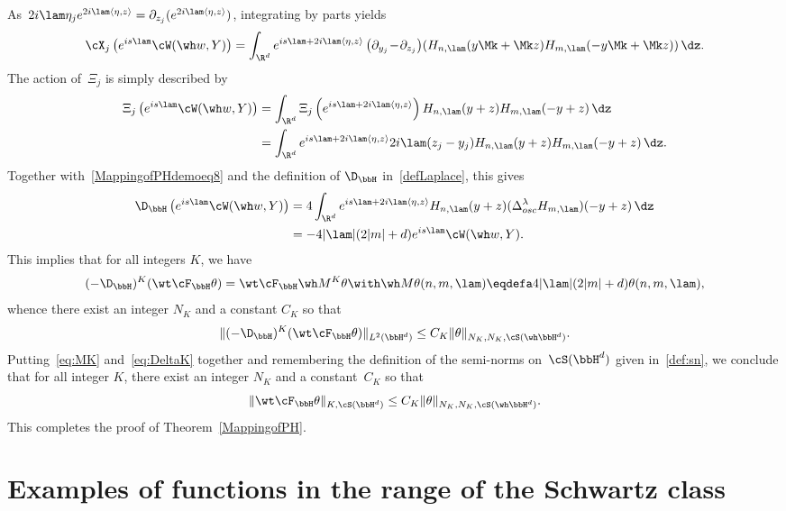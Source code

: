 As~$2i \lam \eta_j e^{2i\lam \langle \eta,z\rangle } = \partial_{z_j}(e^{2i\lam \langle \eta,z\rangle })$, integrating by parts yields
\begin{equation}\label{MappingofPHdemoeq8}
\cX_j \left(e^{is\lam} \cW (\wh w, Y) \right) = \int_{\R^d} e^{is\lam +2i\lam \langle \eta,z\rangle }
\left(\partial_{y_j}\!-\!\partial_{z_j}\right)\! \left(H_{n,\lam}(y\Mk+\Mk z) H_{m,\lam} (-y\Mk+\Mk z)\right) \dz.
\end{equation}
The action of~$\Xi_j$ is simply described by
\[
\begin{aligned}
\Xi_j \left(e^{is\lam} \cW (\wh w, Y) \right) & = \int_{\R^d} \Xi_j \left(e^{is\lam +2i\lam \langle \eta,z\rangle}\right) H_{n,\lam}(y+z) H_{m,\lam} (-y+z)\, \dz\\
& = \int_{\R^d} e^{is\lam +2i\lam \langle \eta,z\rangle} 2i\lam(z_j -y_j) H_{n,\lam}(y+z) H_{m,\lam} (-y+z)\, \dz.
\end{aligned}
\]
Together with~\eqref{MappingofPHdemoeq8} and the definition of $\D_\bbH$ in~\eqref{defLaplace}, this gives
\[
\begin{aligned}
\D_\bbH \left(e^{is\lam} \cW(\wh w,Y)\right) &=4\int _{\R^d} e^{is\lam +2i\lam \langle \eta,z\rangle} H_{n,\lam}(y+z) (\Delta_{osc}^\lambda H_{m,\lam}) (-y+z)\, \dz\\&= -4|\lam| (2|m|+d) e^{is\lam} \cW(\wh w,Y).
\end{aligned}
\]
This implies that for all integers $K$, we have
\[
(-\D_\bbH)^K (\wt\cF_\bbH \theta) = \wt\cF_\bbH \wh M^K \theta \with \wh M \theta (n,m,\lam) \eqdefa 4|\lam|(2|m|+d)\theta (n,m,\lam),
\]
whence there exist an integer $N_K$ and a constant $C_K$ so that
\begin{equation}\label{eq:DeltaK}
\|(-\D_\bbH)^K(\wt\cF_\bbH\theta)\|_{L^2(\bbH^d)}\leq C_K\|\theta\|_{N_K,N_K,\cS(\wh\bbH^d)}.
\end{equation}
Putting~\eqref{eq:MK} and~\eqref{eq:DeltaK} together and remembering the definition of the semi-norms on~$\cS(\bbH^d)$ given in~\eqref{def:sn}, we conclude that for all integer $K$, there exist an integer $N_K$ and a constant~$C_K$ so that
\[
\|\wt\cF_\bbH\theta\|_{K,\cS(\bbH^d)}\leq C_K\|\theta\|_{N_K,N_K,\cS(\wh\bbH^d)}.
\]
This completes the proof of Theorem~\ref{MappingofPH}.


\section{Examples of functions in the range of the Schwartz class}\label{ExamplescSwhH}

